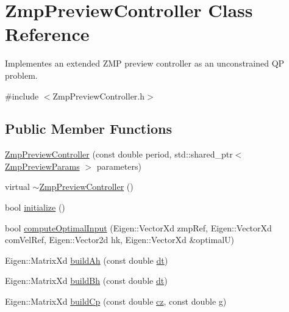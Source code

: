 \hypertarget{classZmpPreviewController}{}\section{Zmp\+Preview\+Controller Class Reference}
\label{classZmpPreviewController}


Implementes an extended Z\+MP preview controller as an unconstrained QP problem.  




{\ttfamily \#include $<$Zmp\+Preview\+Controller.\+h$>$}

\subsection*{Public Member Functions}
\begin{DoxyCompactItemize}
\item 
\hyperlink{classZmpPreviewController_a26b5bd0bdd476f70c2009d77d5495b24}{Zmp\+Preview\+Controller} (const double period, std\+::shared\+\_\+ptr$<$ \hyperlink{structZmpPreviewParams}{Zmp\+Preview\+Params} $>$ parameters)
\item 
virtual \hyperlink{classZmpPreviewController_af702c45f318c7a78310d19cc061886dd}{$\sim$\+Zmp\+Preview\+Controller} ()
\item 
bool \hyperlink{classZmpPreviewController_ac28287e01187bff2cea5a68292d936bd}{initialize} ()
\item 
bool \hyperlink{classZmpPreviewController_a6e60eaa9ec24031a4acd10c9433a7bd0}{compute\+Optimal\+Input} (Eigen\+::\+Vector\+Xd zmp\+Ref, Eigen\+::\+Vector\+Xd com\+Vel\+Ref, Eigen\+::\+Vector2d hk, Eigen\+::\+Vector\+Xd \&optimalU)
\item 
Eigen\+::\+Matrix\+Xd \hyperlink{classZmpPreviewController_a39ffdba07960f90a6cce247065f12504}{build\+Ah} (const double \hyperlink{classZmpPreviewController_abf1a3ec8d1698afab1c20bba32b5a724}{dt})
\item 
Eigen\+::\+Matrix\+Xd \hyperlink{classZmpPreviewController_a0114a8bdba920b9a7fb6b35e7b90ddd1}{build\+Bh} (const double \hyperlink{classZmpPreviewController_abf1a3ec8d1698afab1c20bba32b5a724}{dt})
\item 
Eigen\+::\+Matrix\+Xd \hyperlink{classZmpPreviewController_a716fdc040e5eaf9f6fe00c652f205d73}{build\+Cp} (const double \hyperlink{classZmpPreviewController_a3a317d26cc1bbaf8811491724fdd1def}{cz}, const double \hyperlink{classZmpPreviewController_a344571f012aa58250d7625905681bf1b}{g})
\item 

\end{DoxyCompactItemize}
